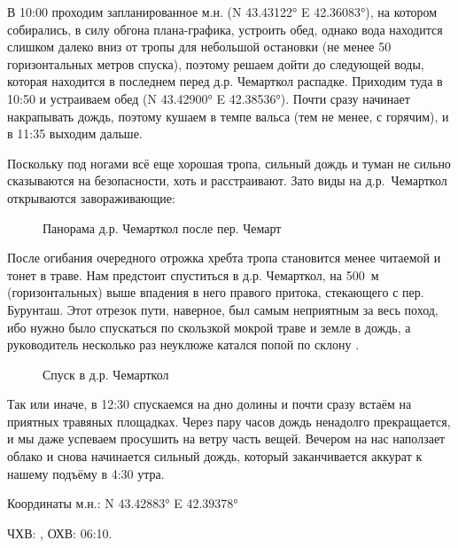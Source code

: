 																В 10:00 проходим запланированное м.н. (N 43.43122° E 42.36083°), на котором собирались, в силу обгона плана-графика, устроить обед, однако вода находится слишком далеко вниз от тропы для небольшой остановки (не менее 50 горизонтальных метров спуска), поэтому решаем дойти до следующей воды, которая находится в последнем перед д.р. Чемарткол распадке. Приходим туда в 10:50 и устраиваем обед (N 43.42900° E 42.38536°). Почти сразу начинает накрапывать дождь, поэтому кушаем в темпе вальса (тем не менее, с горячим), и в 11:35 выходим дальше. 
																
																Поскольку под ногами всё еще хорошая тропа, сильный дождь и туман не сильно сказываются на безопасности, хоть и расстраивают. Зато виды на д.р.~Чемарткол открываются завораживающие:
																
\begin{figure}[h!]
	\centering
	\caption{Панорама д.р. Чемарткол после пер. Чемарт}
	\label{fig:chemart_panorama}
\end{figure}										

После огибания очередного отрожка хребта тропа становится менее читаемой и тонет в траве. Нам предстоит спуститься в д.р. Чемарткол, на 500~м (горизонтальных) выше впадения в него правого притока, стекающего с пер. Бурунташ. Этот отрезок пути, наверное, был самым неприятным за весь поход, ибо нужно было спускаться по скользкой мокрой траве и земле в дождь, а руководитель несколько раз неуклюже катался попой по склону \smiley.

\begin{figure}[h!]
	\centering
	\caption{Спуск в д.р. Чемарткол}
	\label{fig:downhill}
\end{figure}



Так или иначе, в 12:30 спускаемся на дно долины и почти сразу встаём на приятных травяных площадках. Через пару часов дождь ненадолго прекращается, и мы даже успеваем просушить на ветру часть вещей. Вечером на нас наползает облако и снова начинается сильный дождь, который заканчивается аккурат к нашему подъёму в 4:30 утра.

Координаты м.н.: N 43.42883° E 42.39378°

ЧХВ: , ОХВ: 06:10.
											
\clearpage